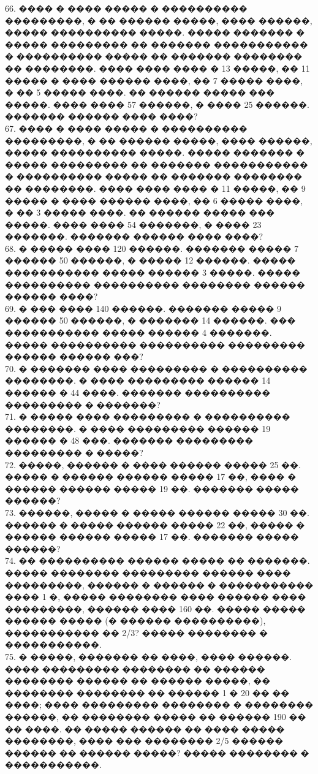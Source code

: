 \documentclass[12pt]{article}
\begin{document}
66. ���� � ���� ����� � ���������� ���������, � �� ������ �����, ���� ������, ����� ���������� �����. ����� ������� � ����� ��������� �� ������� ����������� � ���������� ����� �� ������� �������� �� ��������. ���� ���� ���� � 13 �����, �� 11 ����� � ���� ������ ����, �� 7 ����� ����, � �� 5 ����� ����. �� ������ ����� ��� �����. ���� ���� 57 ������, � ���� 25 ������. ������� ������ ���� ����?\\
67. ���� � ���� ����� � ���������� ���������, � �� ������ �����, ���� ������, ����� ���������� �����. ����� ������� � ����� ��������� �� ������� ����������� � ���������� ����� �� ������� �������� �� ��������. ���� ���� ���� � 11 �����, �� 9 ����� � ���� ������ ����, �� 6 ����� ����, � �� 3 ����� ����. �� ������ ����� ��� �����. ���� ���� 54 �������, � ���� 23 �������. ������� ������ ���� ����?\\
68. � ����� ���� 120 ������. ������� ����� 7 ������ 50 ������, � ����� 12 ������. ����� ����������� ����� ������ 3 �����. ����� ���������� ���������� �������� ������ ������ ����?\\
69. � ��� ���� 140 ������. ������� ����� 9 ������ 50 ������, � ������� 14 ������. ��� ����������� ����� ������ 4 �������. ����� ���������� ���������� ��������� ������ ������ ���?\\
70. � ������� ���� ��������� � ���������� ��������. � ���� ��������� ������ 14 ������ � 44 ����. ������� ���������� ��������� � �������?\\
71. � ����� ���� ��������� � ���������� ��������. � ���� ��������� ������ 19 ������ � 48 ���. ������� ��������� ��������� � �����?\\
72. �����, ������ � ���� ������ ����� 25 ��. ����� � ������ ������ ����� 17 ��, ���� � ������ ������ ����� 19 ��. ������� ����� ������?\\
73. ������, ����� � ����� ������ ����� 30 ��. ������ � ����� ������ ����� 22 ��, ����� � ������ ������ ����� 17 ��. ������� ����� ������?\\
74. �� ���������� ������ ����� �� �������. ����� �������� ��������� ������ ���� ���������, ������ � ������ � ����������� ���� 1 �, ����� �������� ���� ������ ���� ���������, ������ ���� 160 ��. ����� ����� ������ ����� (� ������ ����������), ����������� �� 2/3? ����� �������� � �����������.\\
75. � �����, ������� �� ����, ���� ������. ���� ��������� �������� �� ������ �������� ������ �� ������ �����, �� �������� �������� �� ������ 1 � 20 �� �� ����; ���� ��������� �������� � �������� ������, �� �������� ����� �� ������ 190 �� �� ����. �� ����� ������ �� ���� ����� ��������, ���� ��� �������� 2/5 ������ ������ �� ������ �����? ����� �������� � �����������.\\
\end{document}
